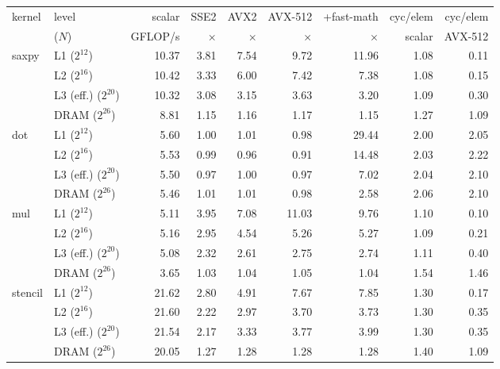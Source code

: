 \begin{tabular}{llrrrrrrr}
\toprule
kernel & level & scalar & SSE2 & AVX2 & AVX-512 & +fast-math & cyc/elem & cyc/elem \\
 & ($N$) & GFLOP/s & $\times$ & $\times$ & $\times$ & $\times$ & scalar & AVX-512 \\
\midrule
saxpy & L1 ($2^{12}$) & 10.37 & 3.81 & 7.54 & 9.72 & 11.96 & 1.08 & 0.11 \\
 & L2 ($2^{16}$) & 10.42 & 3.33 & 6.00 & 7.42 & 7.38 & 1.08 & 0.15 \\
 & L3 (eff.) ($2^{20}$) & 10.32 & 3.08 & 3.15 & 3.63 & 3.20 & 1.09 & 0.30 \\
 & DRAM ($2^{26}$) & 8.81 & 1.15 & 1.16 & 1.17 & 1.15 & 1.27 & 1.09 \\
\addlinespace
dot & L1 ($2^{12}$) & 5.60 & 1.00 & 1.01 & 0.98 & 29.44 & 2.00 & 2.05 \\
 & L2 ($2^{16}$) & 5.53 & 0.99 & 0.96 & 0.91 & 14.48 & 2.03 & 2.22 \\
 & L3 (eff.) ($2^{20}$) & 5.50 & 0.97 & 1.00 & 0.97 & 7.02 & 2.04 & 2.10 \\
 & DRAM ($2^{26}$) & 5.46 & 1.01 & 1.01 & 0.98 & 2.58 & 2.06 & 2.10 \\
\addlinespace
mul & L1 ($2^{12}$) & 5.11 & 3.95 & 7.08 & 11.03 & 9.76 & 1.10 & 0.10 \\
 & L2 ($2^{16}$) & 5.16 & 2.95 & 4.54 & 5.26 & 5.27 & 1.09 & 0.21 \\
 & L3 (eff.) ($2^{20}$) & 5.08 & 2.32 & 2.61 & 2.75 & 2.74 & 1.11 & 0.40 \\
 & DRAM ($2^{26}$) & 3.65 & 1.03 & 1.04 & 1.05 & 1.04 & 1.54 & 1.46 \\
\addlinespace
stencil & L1 ($2^{12}$) & 21.62 & 2.80 & 4.91 & 7.67 & 7.85 & 1.30 & 0.17 \\
 & L2 ($2^{16}$) & 21.60 & 2.22 & 2.97 & 3.70 & 3.73 & 1.30 & 0.35 \\
 & L3 (eff.) ($2^{20}$) & 21.54 & 2.17 & 3.33 & 3.77 & 3.99 & 1.30 & 0.35 \\
 & DRAM ($2^{26}$) & 20.05 & 1.27 & 1.28 & 1.28 & 1.28 & 1.40 & 1.09 \\
\bottomrule
\end{tabular}
